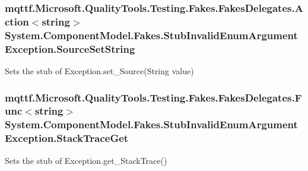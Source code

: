 \hypertarget{class_system_1_1_component_model_1_1_fakes_1_1_stub_invalid_enum_argument_exception_a84b1469eb5300b91ac6978d912c29cfd}{
\subsubsection[{Source\-Set\-String}]{\setlength{\rightskip}{0pt plus 5cm}mqttf.\-Microsoft.\-Quality\-Tools.\-Testing.\-Fakes.\-Fakes\-Delegates.\-Action$<$string$>$ System.\-Component\-Model.\-Fakes.\-Stub\-Invalid\-Enum\-Argument\-Exception.\-Source\-Set\-String}}\label{class_system_1_1_component_model_1_1_fakes_1_1_stub_invalid_enum_argument_exception_a84b1469eb5300b91ac6978d912c29cfd}


Sets the stub of Exception.\-set\-\_\-\-Source(\-String value)

\hypertarget{class_system_1_1_component_model_1_1_fakes_1_1_stub_invalid_enum_argument_exception_ad6d5fc863ef5097db20fabf801ac1840}{
\subsubsection[{Stack\-Trace\-Get}]{\setlength{\rightskip}{0pt plus 5cm}mqttf.\-Microsoft.\-Quality\-Tools.\-Testing.\-Fakes.\-Fakes\-Delegates.\-Func$<$string$>$ System.\-Component\-Model.\-Fakes.\-Stub\-Invalid\-Enum\-Argument\-Exception.\-Stack\-Trace\-Get}}\label{class_system_1_1_component_model_1_1_fakes_1_1_stub_invalid_enum_argument_exception_ad6d5fc863ef5097db20fabf801ac1840}


Sets the stub of Exception.\-get\-\_\-\-Stack\-Trace()

